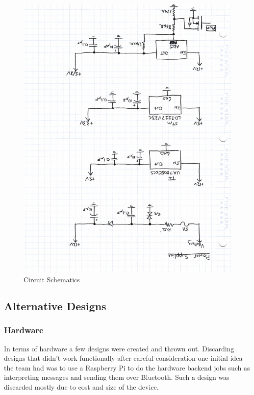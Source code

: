 \documentclass[12pt,letterpaper]{article}
\begin{document}
\begin{figure}[H]
\centering
\includegraphics[page=4, totalheight=20cm, angle=180]{images/circuit_sch.pdf}
\caption{Circuit Schematics}
\label{fig: image}
\end{figure}

\subsection{Alternative Designs}
\subsubsection{Hardware}
In terms of hardware a few designs were created and thrown out. Discarding designs that didn't work functionally after careful consideration one initial idea the team had was to use a Raspberry Pi to do the hardware backend jobs such as interpreting messages and sending them over Bluetooth. Such a design was discarded mostly due to cost and size of the device.\\ 
\end{document}
